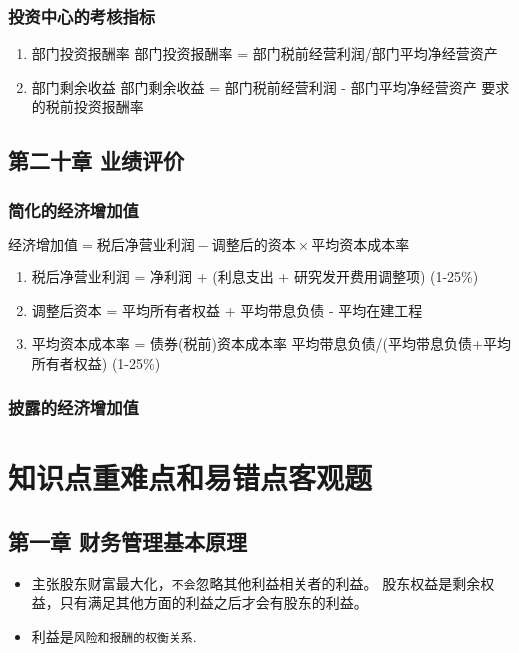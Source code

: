 \documentclass[12pt,a4paper]{article}
\begin{document}
\subsubsection{投资中心的考核指标}
\label{sec:org1b5923b}
\begin{enumerate}
\item 部门投资报酬率
\label{sec:orgdb99ccc}
部门投资报酬率 = 部门税前经营利润/部门平均净经营资产
\item 部门剩余收益
\label{sec:orgf2426b5}
部门剩余收益 = 部门税前经营利润 - 部门平均净经营资产\texttimes{} 要求的税前投资报酬率
\end{enumerate}
\subsection{第二十章 业绩评价}
\label{sec:orgfad056b}
\subsubsection{简化的经济增加值}
\label{sec:orgb27d51c}
\(经济增加值 = 税后净营业利润 - 调整后的资本 \times 平均资本成本率\)
\begin{enumerate}
\item 税后净营业利润 = 净利润 + (利息支出 + 研究发开费用调整项) \texttimes{} (1-25\%)
\item 调整后资本 = 平均所有者权益 + 平均带息负债 - 平均在建工程
\item 平均资本成本率 = 债券(税前)资本成本率 \texttimes{} 平均带息负债/(平均带息负债+平均所有者权益) \texttimes{} (1-25\%)
\end{enumerate}
\subsubsection{披露的经济增加值}
\label{sec:org306f126}
\section{知识点重难点和易错点\hfill{}\textsc{客观题}}
\label{sec:org9c1a947}
\subsection{第一章 财务管理基本原理}
\label{sec:org9b59bfd}
\begin{itemize}
\item 主张股东财富最大化，\texttt{不会}忽略其他利益相关者的利益。
股东权益是剩余权益，只有满足其他方面的利益之后才会有股东的利益。
\item 利益是\texttt{风险和报酬的权衡关系}.
\end{itemize}
\end{document}
